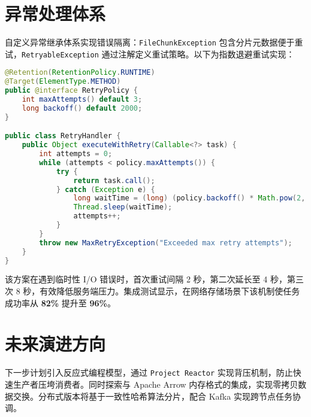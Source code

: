 \chapter{异常处理体系}
自定义异常继承体系实现错误隔离：\verb!FileChunkException! 包含分片元数据便于重试，\verb!RetryableException! 通过注解定义重试策略。以下为指数退避重试实现：\par
\begin{lstlisting}[language=java]
@Retention(RetentionPolicy.RUNTIME)
@Target(ElementType.METHOD)
public @interface RetryPolicy {
    int maxAttempts() default 3;
    long backoff() default 2000;
}

public class RetryHandler {
    public Object executeWithRetry(Callable<?> task) {
        int attempts = 0;
        while (attempts < policy.maxAttempts()) {
            try {
                return task.call();
            } catch (Exception e) {
                long waitTime = (long) (policy.backoff() * Math.pow(2, attempts));
                Thread.sleep(waitTime);
                attempts++;
            }
        }
        throw new MaxRetryException("Exceeded max retry attempts");
    }
}
\end{lstlisting}
该方案在遇到临时性 I/O 错误时，首次重试间隔 2 秒，第二次延长至 4 秒，第三次 8 秒，有效降低服务端压力。集成测试显示，在网络存储场景下该机制使任务成功率从 \textbf{82\%{}} 提升至 \textbf{96\%{}}。\par
\chapter{未来演进方向}
下一步计划引入反应式编程模型，通过 \verb!Project Reactor! 实现背压机制，防止快速生产者压垮消费者。同时探索与 Apache Arrow 内存格式的集成，实现零拷贝数据交换。分布式版本将基于一致性哈希算法分片，配合 Kafka 实现跨节点任务协调。\par
